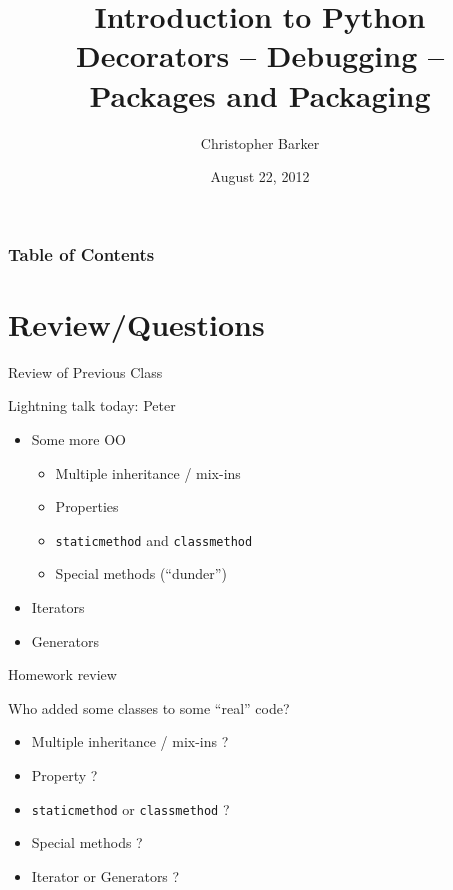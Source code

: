 \documentclass{beamer}
\title[Intro to Python: Week 8]{Introduction  to Python\\
                                Decorators -- Debugging -- Packages and Packaging}
\author{Christopher Barker}
\institute{UW Continuing Education / Isilon}
\date{August 22, 2012}
\begin{document}
\begin{frame}
  \titlepage
\end{frame}

\begin{frame}
\frametitle{Table of Contents}
  \tableofcontents
\end{frame}


\section{Review/Questions}

\begin{frame}[fragile]{Review of Previous Class}

{\Large Lightning talk today: Peter}

\begin{itemize}
    \item Some more OO
    \begin{itemize}
      \item Multiple inheritance / mix-ins
      \item Properties
      \item \verb|staticmethod| and \verb|classmethod|
      \item Special methods (``dunder'')
    \end{itemize}
      \item Iterators
      \item Generators
\end{itemize}

\end{frame}


\begin{frame}[fragile]{Homework review}

{\Large Who added some classes to some ``real'' code?}

{\Large 
\begin{itemize}
      \item Multiple inheritance / mix-ins ?
      \item Property ?
      \item \verb|staticmethod| or \verb|classmethod| ?
      \item Special methods ?
      \item Iterator or Generators ?
\end{itemize}
}
\end{frame}
\end{document}
